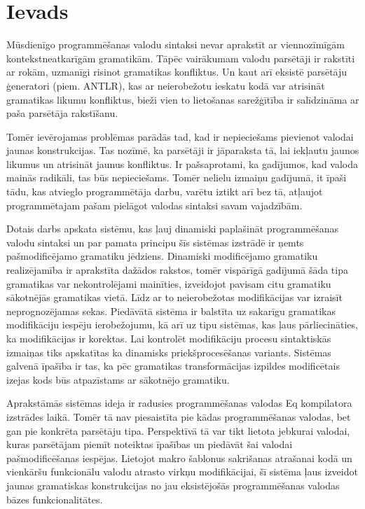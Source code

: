 \section{Ievads}
Mūsdienīgo programmēšanas valodu sintaksi nevar aprakstīt ar viennozīmīgām kontekstneatkarīgām gramatikām. Tāpēc vairākumam valodu parsētāji ir rakstīti ar rokām, uzmanīgi risinot gramatikas konfliktus. Un kaut arī eksistē parsētāju ģeneratori (piem. ANTLR), kas ar neierobežotu ieskatu kodā var atrisināt gramatikas likumu konfliktus, bieži vien to lietošanas sarežģītība ir salīdzināma ar paša parsētāja rakstīšanu.

Tomēr ievērojamas problēmas parādās tad, kad ir nepieciešams pievienot valodai jaunas konstrukcijas. Tas nozīmē, ka parsētāji ir jāparaksta tā, lai iekļautu jaunos likumus un atrisināt jaunus konfliktus. Ir pašsaprotami, ka gadījumos, kad valoda mainās radikāli, tas būs nepieciešams. Tomēr nelielu izmaiņu gadījumā, it īpaši tādu, kas atvieglo programmētāja darbu, varētu iztikt arī bez tā, atļaujot programmētajam pašam pielāgot valodas sintaksi savam vajadzībām.

Dotais darbs apskata sistēmu, kas ļauj dinamiski paplašināt programmēšanas valodu sintaksi un par pamata principu šīs sistēmas izstrādē ir ņemts pašmodificējamo gramatiku jēdziens. Dinamiski modificējamo gramatiku realizējamība ir aprakstīta dažādos rakstos, tomēr vispārīgā gadījumā šāda tipa gramatikas var nekontrolējami mainīties, izveidojot pavisam citu gramatiku sākotnējās gramatikas vietā. Līdz ar to neierobežotas modifikācijas var izraisīt neprognozējamas sekas.
Piedāvātā sistēma ir balstīta uz sakarīgu gramatikas modifikāciju iespēju ierobežojumu, kā arī uz tipu sistēmas, kas ļaus pārliecināties, ka modifikācijas ir korektas. Lai kontrolēt modifikāciju procesu sintaktiskās izmaiņas tiks apskatītas ka dinamisks priekšprocesēšanas variants. Sistēmas galvenā īpašība ir tas, ka pēc gramatikas transformācijas izpildes modificētais izejas kods būs atpazīstams ar sākotnējo gramatiku.

Aprakstāmās sistēmas ideja ir radusies programmēšanas valodas Eq kompilatora izstrādes laikā. Tomēr tā nav piesaistīta pie kādas programmēšanas valodas, bet gan pie konkrēta parsētāju tipa. Perspektīvā tā var tikt lietota jebkurai valodai, kuras parsētājam piemīt noteiktas īpašības un piedāvāt šai valodai pašmodificēšanas iespējas. Lietojot makro šablonus sakrišanas atrašanai kodā un vienkāršu funkcionālu valodu atrasto virkņu modifikācijai, šī sistēma ļaus izveidot jaunas gramatiskas konstrukcijas no jau eksistējošās programmēšanas valodas bāzes funkcionalitātes.

